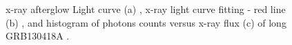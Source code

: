 \begin{figure}[hpbt]
\caption{x-ray  afterglow Light curve (a) , x-ray  light curve fitting - red line (b) , and histogram  of  photons counts  versus x-ray flux  (c)  of long GRB130418A .}
\end{figure}
